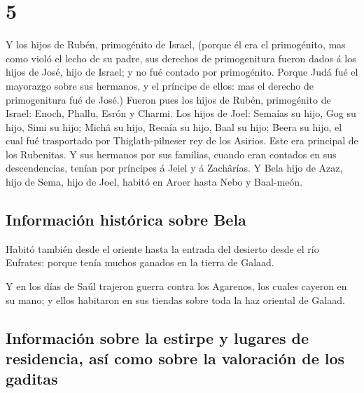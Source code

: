 \hypertarget{section-4}{%
\section{5}\label{section-4}}

 Y los hijos de Rubén, primogénito de Israel, (porque él
era el primogénito, mas como violó el lecho de su padre, sus derechos de
primogenitura fueron dados á los hijos de José, hijo de Israel; y no fué
contado por primogénito.  Porque Judá fué el mayorazgo
sobre sus hermanos, y el príncipe de ellos: mas el derecho de
primogenitura fué de José.)  Fueron pues los hijos de
Rubén, primogénito de Israel: Enoch, Phallu, Esrón y Charmi.
 Los hijos de Joel: Semaías su hijo, Gog su hijo, Simi su
hijo;  Michâ su hijo, Recaía su hijo, Baal su hijo;
 Beera su hijo, el cual fué trasportado por
Thiglath-pilneser rey de los Asirios. Este era principal de los
Rubenitas.  Y sus hermanos por sus familias, cuando eran
contados en sus descendencias, tenían por príncipes á Jeiel y á
Zachârías.  Y Bela hijo de Azaz, hijo de Sema, hijo de
Joel, habitó en Aroer hasta Nebo y Baal-meón.

\hypertarget{informaciuxf3n-histuxf3rica-sobre-bela}{%
\subsection{Información histórica sobre
Bela}\label{informaciuxf3n-histuxf3rica-sobre-bela}}

 Habitó también desde el oriente hasta la entrada del
desierto desde el río Eufrates: porque tenía muchos ganados en la tierra
de Galaad.

 Y en los días de Saúl trajeron guerra contra los
Agarenos, los cuales cayeron en su mano; y ellos habitaron en sus
tiendas sobre toda la haz oriental de Galaad.

\hypertarget{informaciuxf3n-sobre-la-estirpe-y-lugares-de-residencia-asuxed-como-sobre-la-valoraciuxf3n-de-los-gaditas}{%
\subsection{Información sobre la estirpe y lugares de residencia, así
como sobre la valoración de los
gaditas}\label{informaciuxf3n-sobre-la-estirpe-y-lugares-de-residencia-asuxed-como-sobre-la-valoraciuxf3n-de-los-gaditas}}

